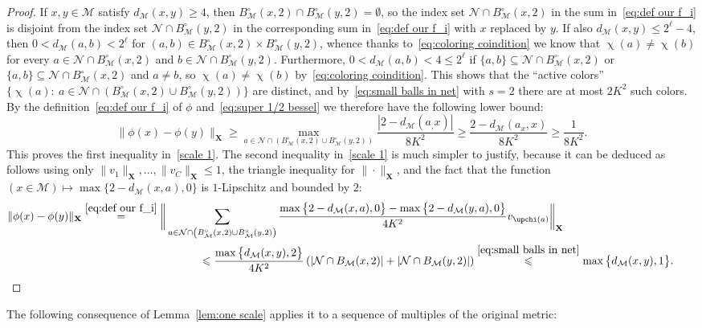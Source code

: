 \documentclass[11pt,reqno]{amsart}
\renewcommand{\le}{\leqslant}
\renewcommand{\ge}{\geqslant}
\renewcommand{\subset}{\subseteq}
\newcommand{\X}{\mathbf X}
\newcommand{\NN}{\mathcal{N}}
\newcommand{\MM}{\mathcal{M}}
\newcommand{\1}{\mathbf{1}}
\begin{document}
\begin{proof}
If  $x,y\in \MM$ satisfy $d_\MM(x,y)\ge 4$, then $B_\MM^\circ(x,2)\cap B_\MM^\circ(y,2)=\emptyset$, so the index set $\NN\cap B_\MM^\circ(x,2)$ in the sum in~\eqref{eq:def our f_i}  is disjoint from the index set $\NN\cap B_\MM^\circ(y,2)$ in the corresponding sum in~\eqref{eq:def our f_i} with $x$ replaced by $y$. If also $d_\MM(x,y)\le 2^{\ell}-4$, then $0<d_\MM(a,b)< 2^{\ell}$ for  $(a,b) \in  B_\MM^\circ(x,2)\times B_\MM^\circ(y,2)$, whence thanks to~\eqref{eq:coloring coindition} we know that $\upchi(a)\neq \upchi(b)$ for every $a\in \NN\cap B_\MM^\circ(x,2)$ and $b\in \NN\cap B_\MM^\circ(y,2)$. Furthermore, $0<d_\MM(a,b)<4\le 2^\ell$ if   $\{a,b\}\subset \NN\cap B_\MM^\circ(x,2)$ or $\{a,b\}\subset \NN\cap B_\MM^\circ(x,2)$ and $a\neq b$, so  $\upchi(a)\neq \upchi(b)$ by~\eqref{eq:coloring coindition}. This shows that the ``active colors'' $\{\upchi(a):\ a\in \NN\cap (B_\MM^\circ(x,2)\cup B_\MM^\circ(y,2))\}$ are distinct, and by~\eqref{eq:small balls in net} with $s=2$ there are at most $2K^2$  such colors. By the definition~\eqref{eq:def our f_i} of $\phi$ and~\eqref{eq:super 1/2 bessel} we therefore have the following lower bound: 
$$
\|\phi(x)-\phi(y)\|_\X \ge  \max_{a\in \NN\cap \left(B_\MM^\circ(x,2)\cup B_\MM^\circ(y,2)\right)} \frac{|2-d_\MM(a_,x)|}{8K^2}
\ge  \frac{2-d_\MM(a_x,x)}{8K^2} \ge \frac{1}{8K^2}.
$$
This proves the first inequality in~\eqref{scale 1}. The second inequality in~\eqref{scale 1} is much simpler to justify, because it can be deduced as follows using only $\|v_1\|_\X,\ldots,\|v_C\|_\X\le 1$, the triangle inequality for $\|\cdot\|_\X$, and the fact that the function  $(x\in \MM)\mapsto  \max\{2-d_\MM(x,a),0\}$ is $1$-Lipschitz and bounded by $2$: 
\begin{align*}
\|\phi(x)-\phi(y)\|_\X\stackrel{\eqref{eq:def our f_i}}{=}\bigg\|&\sum_{a\in \NN\cap \left(B_\MM^\circ(x,2)\cup B_\MM^\circ(y,2)\right)}\frac{\max\big\{2-d_\MM(x,a),0\big\}-\max\big\{2-d_\MM(y,a),0\big\}}{4K^2} v_{\upchi(a)}\bigg\|_\X\\&\ \ \ \ \ \ \ \ \ \le 
\frac{\max\big\{d_\MM(x,y),2\big\}}{4K^2}\left(|\NN\cap B_\MM(x,2)|+|\NN\cap B_\MM(y,2)|\right)\stackrel{\eqref{eq:small balls in net}}{\le} \max\big\{d_\MM(x,y),1\big\}.\tag*{\qedhere}
\end{align*}
\end{proof} 


The following consequence of Lemma~\ref{lem:one scale}  applies it to a sequence of multiples of the original metric:
\end{document}

